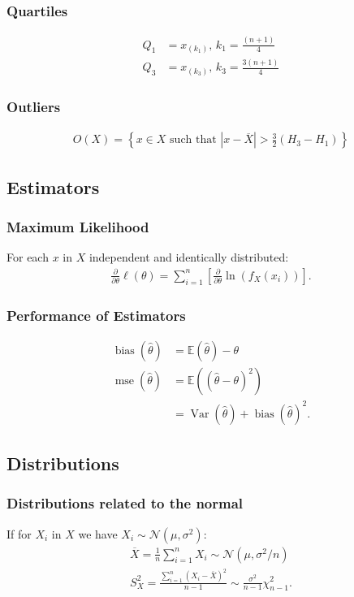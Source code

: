 \documentclass[a4paper, 12pt, twoside]{article}
\DeclareMathOperator{\Mse}{mse}
\DeclareMathOperator{\Bias}{bias}
\DeclareMathOperator{\Var}{Var}
\begin{document}
\subsubsection{Quartiles}
\begin{align*}
    Q_1 & = x_{(k_1)}, \, k_1 = \frac{ (n + 1)}{4} \tag{interpolated} \\
    Q_3 & = x_{(k_3)}, \, k_3 = \frac{3(n + 1)}{4} \tag{interpolated}
\end{align*}

\subsubsection{Outliers}
\begin{gather*}
    O(X) = \left\{x \in X \text{ such that }
    |x - \overline{X}| > \frac{3}{2}(H_3 - H_1)\right\}
\end{gather*}

\subsection{Estimators}

\subsubsection{Maximum Likelihood}
For each $x$ in $X$ independent and identically distributed:
\begin{gather*}
    \frac{\partial}{\partial\theta}\ell(\theta) =
    \sum_{i = 1}^n\left[\frac{\partial}{\partial\theta}\ln{(f_X(x_i))}\right].
\end{gather*}

\subsubsection{Performance of Estimators}
\begin{align*}
    \Bias(\hat\theta) & = \mathbb{E}(\hat\theta) - \theta         \\
    \Mse(\hat\theta)  & = \mathbb{E}((\hat\theta - \theta)^2)     \\
                      & = \Var(\hat\theta) + \Bias(\hat\theta)^2.
\end{align*}

\subsection{Distributions}

\subsubsection{Distributions related to the normal}
If for $X_i$ in $X$ we have $X_i \sim \mathcal{N}(\mu, \sigma^2)$:
\begin{gather*}
    \overline{X} = \frac{1}{n} \sum_{i = 1}^n X_i
    \sim \mathcal{N}(\mu, \sigma^2 / n) \\
    S_X^2 = \frac{\sum_{i = 1}^n (X_i - \overline{X})^2}{n - 1}
    \sim \frac{\sigma^2}{n - 1} \chi^2_{n - 1}.
\end{gather*}
\end{document}
